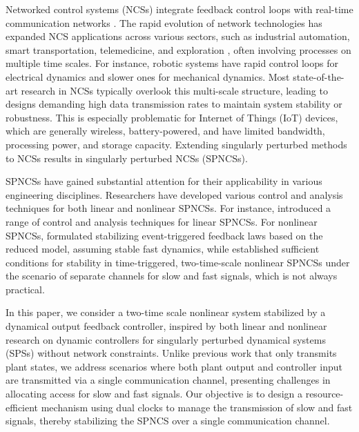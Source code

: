Networked control systems (NCSs) integrate feedback control loops with real-time communication networks \cite{definition}. The rapid evolution of network technologies has expanded NCS applications across various sectors, such as industrial automation, smart transportation, telemedicine, and exploration \cite{xu2018survey}, often involving processes on multiple time scales. For instance, robotic systems have rapid control loops for electrical dynamics and slower ones for mechanical dynamics. Most state-of-the-art research in NCSs \cite{dragan_stability,carnevale_stability,heijmans2017computing} typically overlook this multi-scale structure, leading to designs demanding high data transmission rates to maintain system stability or robustness. This is especially problematic for Internet of Things (IoT) devices, which are generally wireless, battery-powered, and have limited bandwidth, processing power, and storage capacity. Extending singularly perturbed methods \cite{nonlinear_systems_Khalil} to NCSs results in singularly perturbed NCSs (SPNCSs).

SPNCSs have gained substantial attention for their applicability in various engineering disciplines. Researchers have developed various control and analysis techniques for both linear and nonlinear SPNCSs. For instance, \cite{wang2021observer,song2019dynamic,cheng2021ultimate,lei2022event} introduced a range of control and analysis techniques for linear SPNCSs. For nonlinear SPNCSs, \cite{Romain_ETC} formulated stabilizing event-triggered feedback laws based on the reduced model, assuming stable fast dynamics, while \cite{SPNCS} established sufficient conditions for stability in time-triggered, two-time-scale nonlinear SPNCSs under the scenario of separate channels for slow and fast signals, which is not always practical.

In this paper, we consider a two-time scale nonlinear system stabilized by a dynamical output feedback controller, inspired by both linear \cite{linear1980,linear2018,linear2010} and nonlinear \cite{output_feedback} research on dynamic controllers for singularly perturbed dynamical systems (SPSs) without network constraints. Unlike previous work \cite{SPNCS} that only transmits plant states, we address scenarios where both plant output and controller input are transmitted via a single communication channel, presenting challenges in allocating access for slow and fast signals. Our objective is to design a resource-efficient mechanism using dual clocks to manage the transmission of slow and fast signals, thereby stabilizing the SPNCS over a single communication channel.

